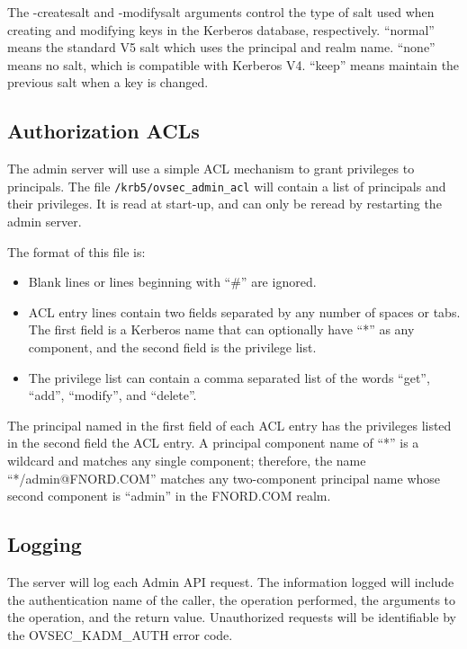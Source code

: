 The -createsalt and -modifysalt arguments control the type of salt
used when creating and modifying keys in the Kerberos database,
respectively.  ``normal'' means the standard V5 salt which uses the
principal and realm name.  ``none'' means no salt, which is compatible
with Kerberos V4.  ``keep'' means maintain the previous salt when a
key is changed.

\subsection{Authorization ACLs}
\label{sec:acls}

The admin server will use a simple ACL mechanism to grant privileges
to principals.  The file {\tt /krb5/ovsec_admin_acl} will contain a
list of principals and their privileges.  It is read at start-up, and
can only be reread by restarting the admin server.

The format of this file is:

\begin{itemize}
\item Blank lines or lines beginning with ``\#'' are ignored.

\item ACL entry lines contain two fields separated by any number of
spaces or tabs.  The first field is a Kerberos name that can
optionally have ``*'' as any component, and the second field is the
privilege list.

\item The privilege list can contain a comma separated list of the
words ``get'', ``add'', ``modify'', and ``delete''.
\end{itemize}

The principal named in the first field of each ACL entry has the
privileges listed in the second field the ACL entry.  A principal
component name of ``*'' is a wildcard and matches any single
component; therefore, the name ``*/admin@FNORD.COM'' matches any
two-component principal name whose second component is ``admin'' in
the FNORD.COM realm.

\subsection{Logging}

The server will log each Admin API request.  The information logged
will include the authentication name of the caller, the operation
performed, the arguments to the operation, and the return value.
Unauthorized requests will be identifiable by the OVSEC_KADM_AUTH
error code.

